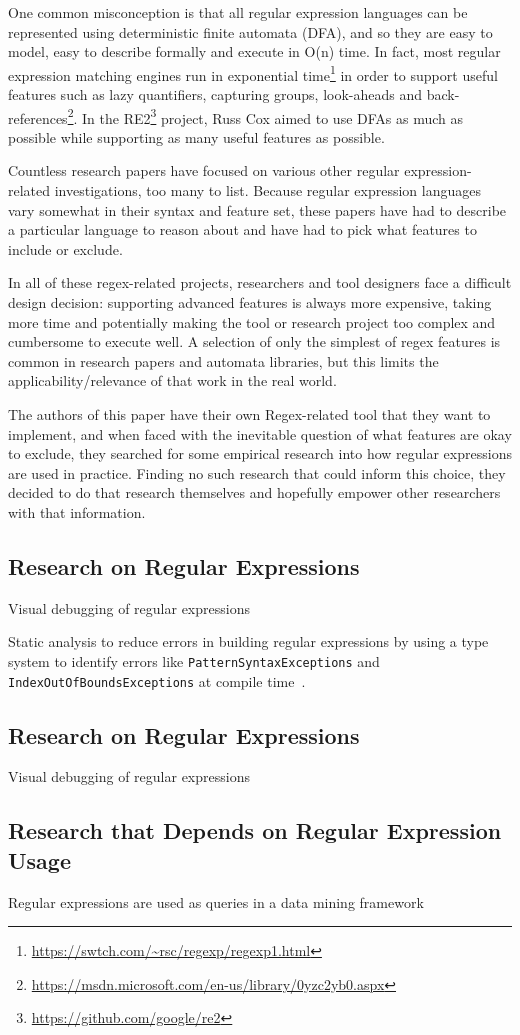 One common misconception is that all regular expression languages can be represented using deterministic finite automata (DFA), and so they are easy to model, easy to describe formally and execute in O(n) time.  In fact, most regular expression matching engines run in exponential time\footnote{\url{https://swtch.com/~rsc/regexp/regexp1.html}} in order to support useful features such as lazy quantifiers, capturing groups, look-aheads and back-references\footnote{\url{https://msdn.microsoft.com/en-us/library/0yzc2yb0.aspx}}.  In the RE2\footnote{\url{https://github.com/google/re2}} project, Russ Cox aimed to use DFAs as much as possible while supporting as many useful features as possible.

Countless research papers have focused on various other regular expression-related investigations, too many to list.  Because regular expression languages vary somewhat in their syntax and feature set, these papers have had to describe a particular language to reason about and have had to pick what features to include or exclude.

In all of these regex-related projects, researchers and tool designers face a difficult design decision: supporting advanced features is always more expensive, taking more time and potentially making the tool or research project too complex and cumbersome to execute well.  A selection of only the simplest of regex features is common in research papers and automata libraries, but this limits the applicability/relevance of that work in the real world.

The authors of this paper have their own Regex-related tool that they want to implement, and when faced with the inevitable question of what features are okay to exclude, they searched for some empirical research into how regular expressions are used in practice.  Finding no such research that could inform this choice, they decided to do that research themselves and hopefully empower other researchers with that information.




\subsection{Research on Regular Expressions}
Visual debugging of regular expressions~\cite{Beck:2014:RVD:2591062.2591111}

Static analysis to reduce errors in building regular expressions by using a type system to identify errors like {\tt PatternSyntaxExceptions} and {\tt IndexOutOfBoundsExceptions} at compile time~\cite{Spishak:2012:TSR:2318202.2318207}.

\subsection{Research on Regular Expressions}
Visual debugging of regular expressions~\cite{Beck:2014:RVD:2591062.2591111}

\subsection{Research that Depends on Regular Expression Usage}
Regular expressions are used as queries in a data mining framework~\cite{Begel:2010:CDE:1806799.1806821}

